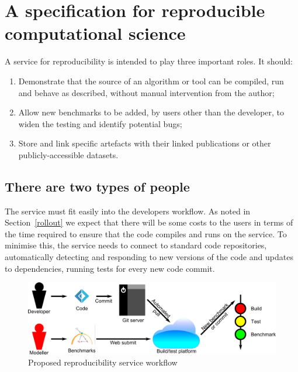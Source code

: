 \documentclass[conference]{IEEEtran}
\begin{document}
\section{A specification for reproducible computational science}\label{spec}

A service for reproducibility is intended to play three important
roles. It should:

\begin{enumerate}
\item Demonstrate that the source of an algorithm or tool can be
  compiled, run and behave as described, without manual intervention
  from the author; 
\item Allow new benchmarks to be added, by users other than
the developer, to widen the testing and identify potential bugs; 
\item Store and link specific artefacts with their linked
publications or other publicly-accessible datasets. 
\end{enumerate}

\subsection{There are two types of people}

The service must fit easily into the developers workflow. As
noted in Section~\ref{rollout} we expect that there will be some costs
to the users in terms of the time required to ensure that the code
compiles and runs on the service. To minimise this, the service needs
to connect to standard code repositories, automatically detecting and
responding to new versions of the code and updates to dependencies,
running tests for every new code commit.

\begin{figure}[!htp]
	\centering
	\includegraphics[width=\textwidth]{workflow}
	\caption{Proposed reproducibility service workflow}
	\label{schematic}
\end{figure}
\end{document}
